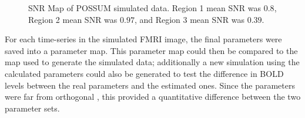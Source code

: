 \begin{figure}
\centering
{}
\caption{SNR Map of POSSUM simulated data. Region 1 mean SNR was $0.8$, Region 2 mean SNR was $0.97$, and 
Region 3 mean SNR was $0.39$.}
\label{fig:SimSNRhm}
\end{figure}

For each time-series in the simulated FMRI image, the final parameters were saved
into a parameter map. This parameter map could then be compared to the map used to generate the 
simulated data; additionally a new simulation using the calculated parameters could also be 
generated to test the difference in BOLD levels between the real parameters and the
estimated ones. Since the parameters were far from orthogonal 
\cite{Deneux2006}, this provided a quantitative difference between the two parameter sets.

